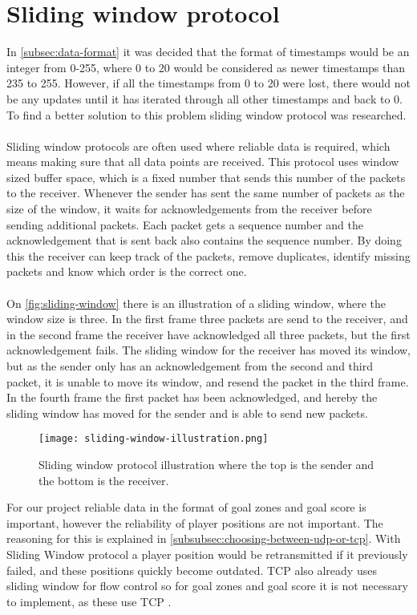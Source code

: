 \section{Sliding window protocol}
In \autoref{subsec:data-format} it was decided that the format of timestamps would be an integer from 0-255, where 0 to 20 would be considered as newer timestamps than 235 to 255.
However, if all the timestamps from 0 to 20 were lost, there would not be any updates until it has iterated through all other timestamps and back to 0.
To find a better solution to this problem sliding window protocol was researched.
\\\\
Sliding window protocols are often used where reliable data is required, which means making sure that all data points are received.
This protocol uses window sized buffer space, which is a fixed number that sends this number of the packets to the receiver.
Whenever the sender has sent the same number of packets as the size of the window, it waits for acknowledgements from the receiver before sending additional packets.
Each packet gets a sequence number and the acknowledgement that is sent back also contains the sequence number.
By doing this the receiver can keep track of the packets, remove duplicates, identify missing packets and know which order is the correct one.
\\\\
On \autoref{fig:sliding-window} there is an illustration of a sliding window, where the window size is three.
In the first frame three packets are send to the receiver, and in the second frame the receiver have acknowledged all three packets, but the first acknowledgement fails.
The sliding window for the receiver has moved its window, but as the sender only has an acknowledgement from the second and third packet, it is unable to move its window, and resend the packet in the third frame.
In the fourth frame the first packet has been acknowledged, and hereby the sliding window has moved for the sender and is able to send new packets.
\begin{figure}[H]
    \centering
    \texttt{[image: sliding-window-illustration.png]}
    \caption{Sliding window protocol illustration where the top is the sender and the bottom is the receiver.}
    \label{fig:sliding-window}
\end{figure}
\noindent
For our project reliable data in the format of goal zones and goal score is important, however the reliability of player positions are not important.
The reasoning for this is explained in \autoref{subsubsec:choosing-between-udp-or-tcp}.
With Sliding Window protocol a player position would be retransmitted if it previously failed, and these positions quickly become outdated.
TCP also already uses sliding window for flow control so for goal zones and goal score it is not necessary to implement, as these use TCP \cite{ibm:sliding-window}.
